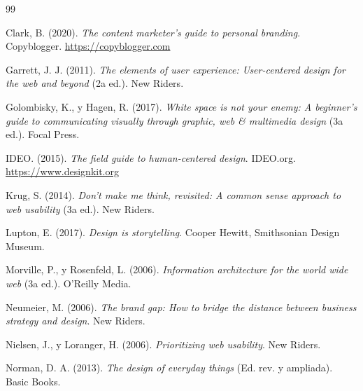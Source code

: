 \documentclass[12pt, letterpaper]{article}
\begin{document}
\begin{thebibliography}{99}

Clark, B. (2020). \textit{The content marketer's guide to personal branding}. Copyblogger. \url{https://copyblogger.com}

Garrett, J. J. (2011). \textit{The elements of user experience: User-centered design for the web and beyond} (2a ed.). New Riders.

Golombisky, K., y Hagen, R. (2017). \textit{White space is not your enemy: A beginner's guide to communicating visually through graphic, web \& multimedia design} (3a ed.). Focal Press.

IDEO. (2015). \textit{The field guide to human-centered design}. IDEO.org. \url{https://www.designkit.org}

Krug, S. (2014). \textit{Don't make me think, revisited: A common sense approach to web usability} (3a ed.). New Riders.

Lupton, E. (2017). \textit{Design is storytelling}. Cooper Hewitt, Smithsonian Design Museum.

Morville, P., y Rosenfeld, L. (2006). \textit{Information architecture for the world wide web} (3a ed.). O'Reilly Media.

Neumeier, M. (2006). \textit{The brand gap: How to bridge the distance between business strategy and design}. New Riders.

Nielsen, J., y Loranger, H. (2006). \textit{Prioritizing web usability}. New Riders.

Norman, D. A. (2013). \textit{The design of everyday things} (Ed. rev. y ampliada). Basic Books.

\end{thebibliography}
\end{document}
